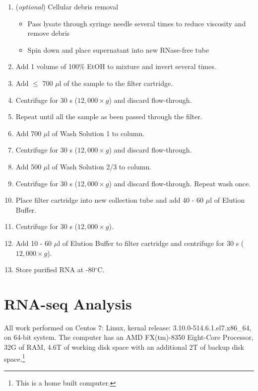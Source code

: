 \begin{enumerate}
\item (\textit{optional}) Cellular debris removal\footnotemark {}
  \begin{itemize}
  \item Pass lysate through syringe needle several times to reduce viscosity and remove debris
  \item Spin down and place supernatant into new RNase-free tube
  \end{itemize}
\item Add 1 volume of 100\% EtOH to mixture\footnotemark {} and invert several times.
\item Add $\le$ 700 $\mu$l of the sample to the filter cartridge.
\item Centrifuge for 30 s ($12,000 \times g$) and discard flow-through.
\item Repeat until all the sample as been passed through the filter.
\item Add 700 $\mu$l of Wash Solution 1 to column.
\item Centrifuge for 30 s ($12,000 \times g$) and discard flow-through.
\item Add 500 $\mu$l of Wash Solution 2/3 to column.
\item Centrifuge for 30 s ($12,000 \times g$) and discard flow-through. Repeat wash once.
\item Place filter cartridge into new collection tube and add 40 - 60 $\mu$l of Elution Buffer.
\item Centrifuge for 30 s ($12,000 \times g$).
\item Add 10 - 60 $\mu$l of Elution Buffer to filter cartridge and centrifuge for 30 s ($12,000 \times g$).
\item Store purified RNA at -80$^{\circ}$C.
\end{enumerate}

\pagebreak

\section{RNA-seq Analysis}

All work performed on Centos 7: Linux, kernal release: 3.10.0-514.6.1.el7.x86\_64, on 64-bit system. The computer has an AMD FX(tm)-8350 Eight-Core Processor, 32G of RAM, 4.6T of working disk space with an additional 2T of backup disk space.\footnote{This is a home built computer.}


